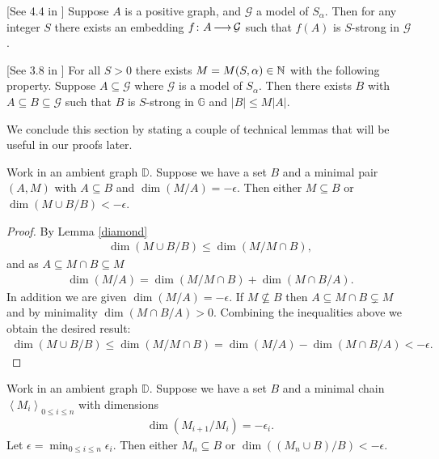 \documentclass{amsart}
\newcommand{\GG}{\mathbb G}
\newcommand{\DB}{\mathbb D}
\newcommand{\G}{\mathcal G}
\newcommand{\agl}[1]{\left\langle #1 \right\rangle}
\begin{document}
\begin{Lemma} \label{las_str} [See 4.4 in \cite{laskowski}]
  Suppose $A$ is a positive graph, and $\G$ a model of $S_\alpha$.
  Then for any integer $S$ there exists an embedding $f \colon A \arr \G$ such that $f(A)$ is $S$-strong in $\G$.
\end{Lemma}
    
\begin{Lemma} \label{las_closure} [See 3.8 in \cite{laskowski}]
  For all $S > 0$ there exists $M = M(S, \alpha) \in \mathbb{N}$ with the following property.
  Suppose $A \subseteq \G$ where $\G$ is a model of $S_\alpha$.
  Then there exists $B$ with $A \subseteq B \subseteq \G$ such that $B$ is $S$-strong in $\GG$ and $|B| \leq M|A|$.
\end{Lemma}

We conclude this section by stating a couple of technical lemmas that will be useful in our proofs later.

\begin{Lemma} \label{minimal_over_set}
  Work in an ambient graph $\DB$.
  Suppose we have a set $B$ and a minimal pair $(A, M)$ with $A \subseteq B$ and $\dim(M/A) = -\epsilon$.
  Then either $M \subseteq B$ or $\dim(M \cup B/B) < -\epsilon$.
\end{Lemma}

\begin{proof}
  By Lemma \ref{diamond}
  \begin{align*}
    \dim(M \cup B/B) \leq \dim(M / M \cap B),
  \end{align*}
  and as $A \subseteq M \cap B \subseteq M$
  \begin{align*}
    \dim (M/A) = \dim(M / M \cap B) + \dim(M \cap B / A).
  \end{align*}
  In addition we are given $\dim (M/A) = -\epsilon$.
  If $M \not\subseteq B$ then $A \subseteq M \cap B \subsetneq M$ and by minimality $\dim(M \cap B / A) > 0$.
  Combining the inequalities above we obtain the desired result:
  \begin{align*}
    \dim(M \cup B/B) \leq \dim(M / M \cap B) = \dim (M/A) - \dim(M \cap B / A) < -\epsilon.
  \end{align*}
\end{proof}

\begin{Lemma}	\label{chain_lemma}
  Work in an ambient graph $\DB$.
  Suppose we have a set $B$ and a minimal chain  $\agl{M_i}_{0 \leq i \leq n}$ with dimensions
  \begin{align*}
    \dim(M_{i+1}/M_i) = -\epsilon_i.
  \end{align*}
  Let $\epsilon = \min_{0 \leq i \leq n} \epsilon_i$.
  Then either $M_n \subseteq B$ or $\dim((M_n \cup B)/B) < -\epsilon$.
\end{Lemma}
\end{document}
